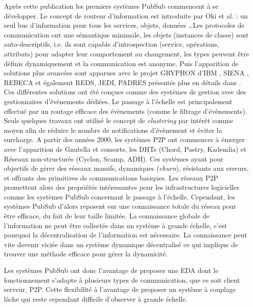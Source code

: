 Après cette publication les premiers systèmes \gls{PubSub} commencent à 
se développer. Le concept de routeur d'information est introduite par Oki et al. 
\cite{Oki1993} : un seul bus d'information pour tous les services, objets, données 
\ldots Les protocoles de communication ont une sémantique minimale, 
les objets (instances de classe) sont auto-descriptifs, i.e. ils sont 
capable d'introspection (service, opérations, attributs) pour adapter leur 
comportement au changement, les types peuvent être définis dynamiquement et 
la communication est anonyme. 
Puis l'apparition de solutions plus avancées sont apparues avec le projet 
GRYPHON d'IBM \cite{Banavar1999}, SIENA \cite{Carzaniga2000}, REBECA 
\cite{Parzyjegla2010} et également REDS, JEDI, PADRES présentés plus en 
détails dans \cite{Tarkoma2012}.
Ces différentes solutions ont été conçues comme des systèmes de gestion avec 
des gestionnaires d'évènements dédiées. Le passage à l'échelle est 
principalement effectué par un routage efficace des évènements (comme le 
filtrage d'évènements). Seuls quelques travaux ont utilisé le concept de 
\textit{clustering} par intérêt comme moyen afin de réduire le nombre de 
notifications d'évènement et éviter la surcharge. 
A partir des années 2000, les 
systèmes \gls{P2P} ont commencer à émerger avec 
l'apparition de Gnutella et consorts, les \glspl{DHT} (Chord, Pastry, Kademlia) et  
Réseaux non-structurés (Cyclon, Scamp, ADH). Ces systèmes ayant pour 
objectifs de gérer des réseaux massifs, dynamiques (\textit{churn}), résistants 
aux 
erreurs, et offrants des primitives de communications basiques.
Les réseaux \gls{P2P} promettent alors des propriétés intéressantes pour les 
infrastructures logicielles comme les systèmes \gls{PubSub} concernant le passage à 
l'échelle. Cependant, les systèmes \gls{PubSub} d'alors reposent sur une connaissance 
totale du réseau pour être efficace, du fait de leur taille limitée. La connaissance 
globale de l'information ne peut être collectée dans un système à grande échelle, 
c'est pourquoi la décentralisation de l'information est nécessaire. La connaissance 
peut vite devenir viciée dans un système dynamique décentralisé ce qui implique 
de trouver une méthode efficace pour gérer la dynamicité.

Les systèmes \gls{PubSub} ont donc l'avantage de proposer une \gls{EDA} dont le 
fonctionnement s'adapte à plusieurs types de communication, que ce soit client 
serveur, P2P. Cette flexibilité à l'avantage de proposer un système à couplage 
lâche qui reste cependant difficile d'observer à grande échelle.

